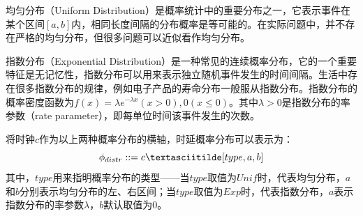 	均匀分布（Uniform Distribution）是概率统计中的重要分布之一，它表示事件在某个区间$[a,b]$内，相同长度间隔的分布概率是等可能的。在实际问题中，并不存在严格的均匀分布，但很多问题可以近似看作均匀分布。
	
	指数分布（Exponential Distribution）是一种常见的连续概率分布，它的一个重要特征是无记忆性，指数分布可以用来表示独立随机事件发生的时间间隔。生活中存在很多指数分布的规律，例如电子产品的寿命分布一般服从指数分布。指数分布的概率密度函数为$f(x)=\lambda e^{- \lambda x}(x>0), 0(x\leqslant 0)$。其中$\lambda >0$是指数分布的率参数（rate parameter），即每单位时间该事件发生的次数。
	
	
	将时钟$c$作为以上两种概率分布的横轴，时延概率分布可以表示为：
	\begin{equation}
	\phi_{distr}::= c \textasciitilde [type,a,b]
	\end{equation}
	其中，$type$用来指明概率分布的类型——当$type$取值为$Unif$时，代表均匀分布，$a$和$b$分别表示均匀分布的左、右区间；当$type$取值为$Exp$时，代表指数分布，$a$表示指数分布的率参数$\lambda$，$b$默认取值为0。
	
	
	
	
	
